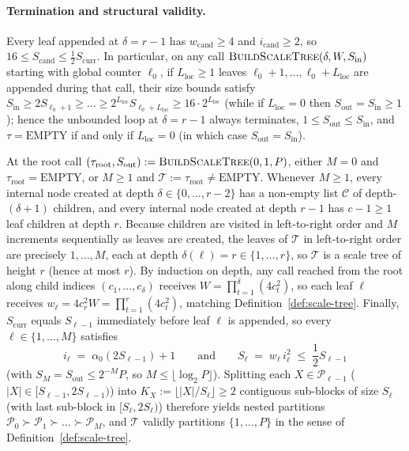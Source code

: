 \documentclass[11pt]{article}
\theoremstyle{definition}
\theoremstyle{remark}
\newcommand{\BuildScaleTree}{\textnormal{\scshape BuildScaleTree}}
\begin{document}
\paragraph{Termination and structural validity.}
Every leaf appended at $\delta = r - 1$ has $w_{\mathrm{cand}} \ge 4$ and $i_{\mathrm{cand}} \ge 2$, so $16 \le S_{\mathrm{cand}} \le \frac{1}{2} S_{\mathrm{curr}}$. In particular, on any call $\BuildScaleTree(\delta, W, S_{\mathrm{in}})$ starting with global counter $\ell_0$, if $L_{\mathrm{loc}} \ge 1$ leaves $\ell_0 + 1, \dots, \ell_0 + L_{\mathrm{loc}}$ are appended during that call, their size bounds satisfy $S_{\mathrm{in}} \ge 2 S_{\ell_0 + 1} \ge \dots \ge 2^{L_{\mathrm{loc}}} S_{\ell_0 + L_{\mathrm{loc}}} \ge 16 \cdot 2^{L_{\mathrm{loc}}}$ (while if $L_{\mathrm{loc}} = 0$ then $S_{\mathrm{out}} = S_{\mathrm{in}} \ge 1$); hence the unbounded loop at $\delta = r - 1$ always terminates, $1 \le S_{\mathrm{out}} \le S_{\mathrm{in}}$, and $\tau = \mathrm{EMPTY}$ if and only if $L_{\mathrm{loc}} = 0$ (in which case $S_{\mathrm{out}} = S_{\mathrm{in}}$).

At the root call $(\tau_{\mathrm{root}}, S_{\mathrm{out}}) := \BuildScaleTree(0, 1, P)$, either $M = 0$ and $\tau_{\mathrm{root}} = \mathrm{EMPTY}$, or $M \ge 1$ and $\mathcal{T} := \tau_{\mathrm{root}} \ne \mathrm{EMPTY}$. Whenever $M \ge 1$, every internal node created at depth $\delta \in \{0, \dots, r - 2\}$ has a non-empty list $\mathcal{C}$ of depth-$(\delta + 1)$ children, and every internal node created at depth $r - 1$ has $c - 1 \ge 1$ leaf children at depth $r$. Because children are visited in left-to-right order and $M$ increments sequentially as leaves are created, the leaves of $\mathcal{T}$ in left-to-right order are precisely $1, \dots, M$, each at depth $\delta(\ell) = r \in \{1, \dots, r\}$, so $\mathcal{T}$ is a scale tree of height $r$ (hence at most $r$). By induction on depth, any call reached from the root along child indices $(c_1, \dots, c_\delta)$ receives $W = \prod_{t=1}^\delta (4 c_t^2)$, so each leaf $\ell$ receives $w_\ell = 4 c_r^2 W = \prod_{t=1}^r (4 c_t^2)$, matching Definition~\ref{def:scale-tree}. Finally, $S_{\mathrm{curr}}$ equals $S_{\ell-1}$ immediately before leaf $\ell$ is appended, so every $\ell \in \{1, \dots, M\}$ satisfies
\[
i_\ell \;=\; \alpha_0(2 S_{\ell-1}) + 1
\qquad\text{and}\qquad
S_\ell \;=\; w_\ell\, i_\ell^2 \;\le\; \frac{1}{2} S_{\ell-1}
\]
(with $S_M = S_{\mathrm{out}} \le 2^{-M} P$, so $M \le \lfloor \log_2 P \rfloor$). Splitting each $X \in \mathcal{P}_{\ell-1}$ ($|X| \in [S_{\ell-1}, 2 S_{\ell-1})$) into $K_X := \lfloor |X| / S_\ell \rfloor \ge 2$ contiguous sub-blocks of size $S_\ell$ (with last sub-block in $[S_\ell, 2 S_\ell)$) therefore yields nested partitions $\mathcal{P}_0 \succ \mathcal{P}_1 \succ \dots \succ \mathcal{P}_M$, and $\mathcal{T}$ validly partitions $\{1, \dots, P\}$ in the sense of Definition~\ref{def:scale-tree}.
\end{document}
